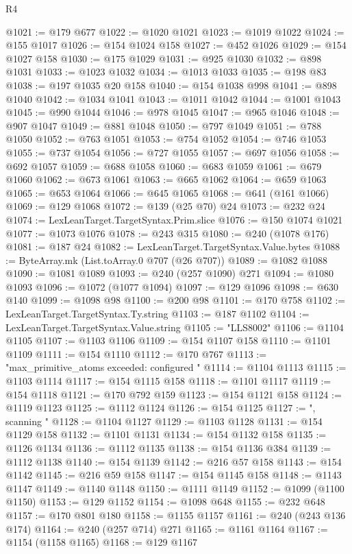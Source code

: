 \begin{lexlean}{R4}
\begin{coremodule}
@1021 := @179 @677
@1022 := @1020 @1021
@1023 := @1019 @1022
@1024 := @155 @1017
@1026 := @154 @1024 @158
@1027 := @452 @1026
@1029 := @154 @1027 @158
@1030 := @175 @1029
@1031 := @925 @1030
@1032 := @898 @1031
@1033 := @1023 @1032
@1034 := @1013 @1033
@1035 := @198 @83
@1038 := @197 @1035 @20 @158
@1040 := @154 @1038 @998
@1041 := @898 @1040
@1042 := @1034 @1041
@1043 := @1011 @1042
@1044 := @1001 @1043
@1045 := @990 @1044
@1046 := @978 @1045
@1047 := @965 @1046
@1048 := @907 @1047
@1049 := @881 @1048
@1050 := @797 @1049
@1051 := @788 @1050
@1052 := @763 @1051
@1053 := @754 @1052
@1054 := @746 @1053
@1055 := @737 @1054
@1056 := @727 @1055
@1057 := @697 @1056
@1058 := @692 @1057
@1059 := @688 @1058
@1060 := @683 @1059
@1061 := @679 @1060
@1062 := @673 @1061
@1063 := @665 @1062
@1064 := @659 @1063
@1065 := @653 @1064
@1066 := @645 @1065
@1068 := @641 (@161 @1066)
@1069 := @129 @1068
@1072 := @139 (@25 @70) @24
@1073 := @232 @24
@1074 := LexLeanTarget.TargetSyntax.Prim.slice
@1076 := @150 @1074 @1021
@1077 := @1073 @1076
@1078 := @243 @315
@1080 := @240 (@1078 @176)
@1081 := @187 @24
@1082 := LexLeanTarget.TargetSyntax.Value.bytes
@1088 := ByteArray.mk (List.toArray.{0} @707 (@26 @707))
@1089 := @1082 @1088
@1090 := @1081 @1089
@1093 := @240 (@257 @1090) @271
@1094 := @1080 @1093
@1096 := @1072 (@1077 @1094)
@1097 := @129 @1096
@1098 := @630 @140
@1099 := @1098 @98
@1100 := @200 @98
@1101 := @170 @758
@1102 := LexLeanTarget.TargetSyntax.Ty.string
@1103 := @187 @1102
@1104 := LexLeanTarget.TargetSyntax.Value.string
@1105 := "LLS8002"
@1106 := @1104 @1105
@1107 := @1103 @1106
@1109 := @154 @1107 @158
@1110 := @1101 @1109
@1111 := @154 @1110
@1112 := @170 @767
@1113 := "max_primitive_atoms exceeded: configured "
@1114 := @1104 @1113
@1115 := @1103 @1114
@1117 := @154 @1115 @158
@1118 := @1101 @1117
@1119 := @154 @1118
@1121 := @170 @792 @159
@1123 := @154 @1121 @158
@1124 := @1119 @1123
@1125 := @1112 @1124
@1126 := @154 @1125
@1127 := ", scanning "
@1128 := @1104 @1127
@1129 := @1103 @1128
@1131 := @154 @1129 @158
@1132 := @1101 @1131
@1134 := @154 @1132 @158
@1135 := @1126 @1134
@1136 := @1112 @1135
@1138 := @154 @1136 @384
@1139 := @1112 @1138
@1140 := @154 @1139
@1142 := @216 @57 @158
@1143 := @154 @1142
@1145 := @216 @59 @158
@1147 := @154 @1145 @158
@1148 := @1143 @1147
@1149 := @1140 @1148
@1150 := @1111 @1149
@1152 := @1099 (@1100 @1150)
@1153 := @129 @1152
@1154 := @1098 @648
@1155 := @232 @648
@1157 := @170 @801 @180
@1158 := @1155 @1157
@1161 := @240 (@243 @136 @174)
@1164 := @240 (@257 @714) @271
@1165 := @1161 @1164
@1167 := @1154 (@1158 @1165)
@1168 := @129 @1167

\end{coremodule}
\end{lexlean}
